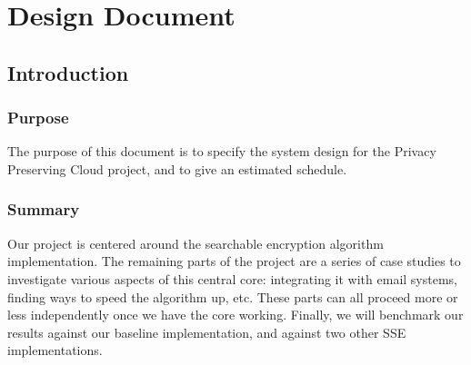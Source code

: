 
\chapter{Design Document}


\section{Introduction}

\subsection{ Purpose }

The purpose of this document is to specify the system design for the Privacy Preserving Cloud project, and to give an estimated schedule.


\subsection{ Summary }





Our project is centered around the searchable encryption algorithm implementation.
The remaining parts of the project are a series of case studies to investigate various aspects of this central core:
integrating it with email systems,
finding ways to speed the algorithm up, etc. 
These parts can all proceed more or less independently once we have the core working.
Finally, we will benchmark our results against our baseline implementation, and against two other SSE implementations.

